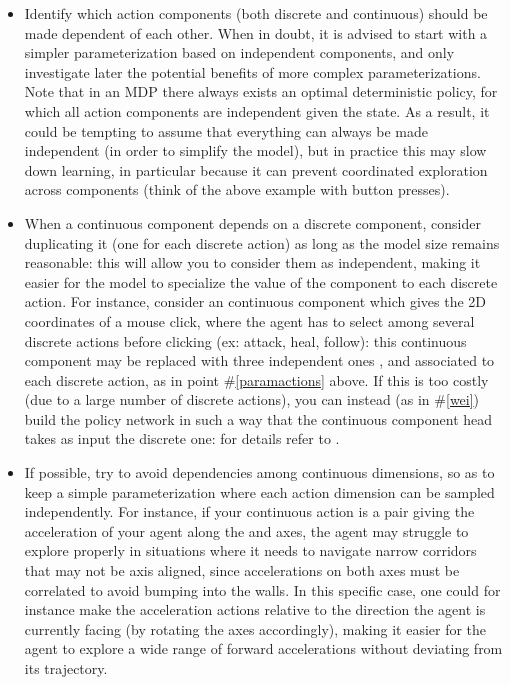 \documentclass[letterpaper]{article} \usepackage{aaai20}  \usepackage{times}  \usepackage{helvet} \usepackage{courier}  \usepackage[hyphens]{url}  \usepackage{graphicx} \urlstyle{rm} \def\UrlFont{\rm}  \usepackage{graphicx}  \usepackage[section]{placeins}
\newcommand{\citet}{\cite}  \newcommand{\citep}{\cite} \DeclareMathOperator*{\softmax}{softmax}
\begin{document}
\begin{itemize}
    \item Identify which action components (both discrete and continuous) should be made dependent of each other.
    When in doubt, it is advised to start with a simpler parameterization based on independent components, and only investigate later the potential benefits of more complex parameterizations.
    Note that in an MDP there always exists an optimal deterministic policy, for which all action components are independent given the state.
    As a result, it could be tempting to assume that everything can always be made independent (in order to simplify the model), but in practice this may slow down learning, in particular because it can prevent coordinated exploration across components (think of the above example with button presses).
    
    \item When a continuous component depends on a discrete component, consider duplicating it (one for each discrete action) as long as the model size remains reasonable: this will allow you to consider them as independent, making it easier for the model to specialize the value of the component to each discrete action.
    For instance, consider an  continuous component which gives the 2D coordinates of a mouse click, where the agent has to select among several discrete actions before clicking (ex: attack, heal, follow): this continuous component may be replaced with three independent ones ,  and  associated to each discrete action, as in point \#\ref{paramactions} above.
    If this is too costly (due to a large number of discrete actions), you can instead (as in \#\ref{wei}) build the policy network in such a way that the continuous component head takes as input the discrete one: for details refer to \citet{wei2018}.
    
    \item If possible, try to avoid dependencies among continuous dimensions, so as to keep a simple parameterization where each action dimension can be sampled independently.
    For instance, if your continuous action is a pair  giving the acceleration of your agent along the  and  axes, the agent may struggle to explore properly in situations where it needs to navigate narrow corridors that may not be axis aligned, since accelerations on both axes must be correlated to avoid bumping into the walls.
    In this specific case, one could for instance make the acceleration actions relative to the direction the agent is currently facing (by rotating the axes accordingly), making it easier for the agent to explore a wide range of forward accelerations without deviating from its trajectory.
    
\end{itemize}
\end{document}

